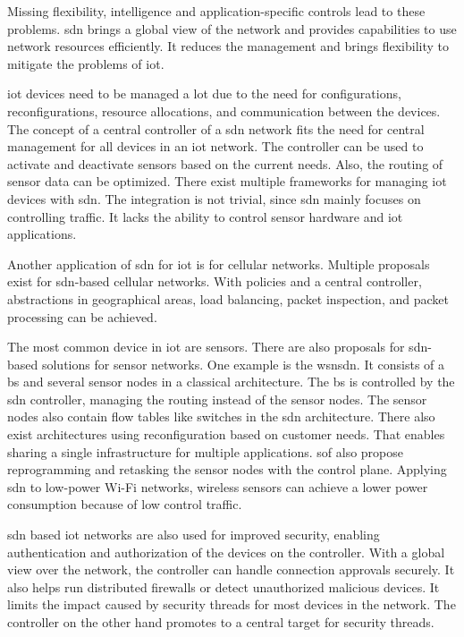 \documentclass[conference]{IEEEtran}
\begin{document}
	Missing flexibility, intelligence and application-specific controls lead to these problems. \ac{sdn} brings a global view of the network and provides capabilities to use network resources efficiently. It reduces the management and brings flexibility to mitigate the problems of \ac{iot}.

	\ac{iot} devices need to be managed a lot due to the need for configurations, reconfigurations, resource allocations, and communication between the devices. \cite{Sahrish2017} The concept of a central controller of a \ac{sdn} network fits the need for central management for all devices in an \ac{iot} network. The controller can be used to activate and deactivate sensors based on the current needs. Also, the routing of sensor data can be optimized. \cite{Li2020-lx} There exist multiple frameworks for managing \ac{iot} devices with \ac{sdn}. \cite{Sahrish2017} The integration is not trivial, since \ac{sdn} mainly focuses on controlling traffic. It lacks the ability to control sensor hardware and \ac{iot} applications. \cite{Li2020-lx}
	
	Another application of \ac{sdn} for \ac{iot} is for cellular networks. Multiple proposals exist for \ac{sdn}-based cellular networks. With policies and a central controller, abstractions in geographical areas, load balancing, packet inspection, and packet processing can be achieved. \cite{Sahrish2017}

	The most common device in \ac{iot} are sensors. There are also proposals for \ac{sdn}-based solutions for sensor networks. One example is the \ac{wsnsdn}. It consists of a \ac{bs} and several sensor nodes in a classical architecture. The \ac{bs} is controlled by the \ac{sdn} controller, managing the routing instead of the sensor nodes. The sensor nodes also contain flow tables like switches in the \ac{sdn} architecture. \cite{Sahrish2017} There also exist architectures using reconfiguration based on customer needs. That enables sharing a single infrastructure for multiple applications. \ac{sof} also propose reprogramming and retasking the sensor nodes with the control plane. \cite{Li2020-lx} Applying \ac{sdn} to low-power Wi-Fi networks, wireless sensors can achieve a lower power consumption because of low control traffic. \cite{Manguri2022-vp}

	\ac{sdn} based \ac{iot} networks are also used for improved security, enabling authentication and authorization of the devices on the controller. With a global view over the network, the controller can handle connection approvals securely. It also helps run distributed firewalls or detect unauthorized malicious devices. \cite{Sahrish2017} It limits the impact caused by security threads for most devices in the network. The controller on the other hand promotes to a central target for security threads. \cite{Li2020-lx}
	
\end{document}
